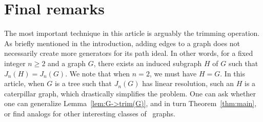 \documentclass{amsart}
\theoremstyle{remark}
\theoremstyle{definition}
\begin{document}
	
	\section{Final remarks}
	
	The most important technique in this article is arguably the trimming operation. As briefly mentioned in the introduction, adding edges to a graph does not necessarily create more generators for its path ideal. In other words, for a fixed integer $n\geq 2$ and a graph $G$, there exists an induced subgraph $H$ of $G$ such that $J_n(H)=J_n(G)$. We note that when $n=2$, we must have $H=G$. In this article, when $G$ is a tree such that $J_n(G)$ has linear resolution, such an $H$ is a caterpillar graph, which drastically simplifies the problem. One can ask whether one can generalize Lemma~\ref{lem:G->trim(G)}, and in turn Theorem~\ref{thm:main}, or find analogs for other interesting classes of ~graphs.
	
	
	
	
	
	
\end{document}
